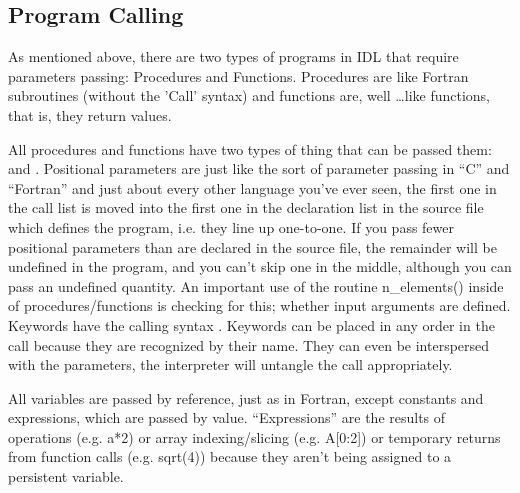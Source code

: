   \ei


\subsection{Program Calling}\label{sec:qs-calling-programs}
  
   As mentioned above, there are two types of programs in IDL that
  require parameters passing: Procedures and Functions. Procedures are
  like Fortran subroutines (without the 'Call' syntax) and functions
  are, well \ldots like functions, that is, they return values.

   All procedures and functions have two types of thing that can be
  passed them:  and
  . Positional parameters are just like the sort of
  parameter passing in ``C'' and ``Fortran'' and just about every
  other language you've ever seen, the first one in the call list is
  moved into the first one in the declaration list in the source file
  which defines the program, i.e. they line up one-to-one. If you pass
  fewer positional parameters than are declared in the source file,
  the remainder will be undefined in the program, and you can't skip one
  in the middle, although you can pass an undefined quantity. An important use of
  the routine n\_elements() inside of
  procedures/functions is checking for this; whether input arguments
  are defined.  Keywords have the calling syntax . Keywords can be placed in any order in the call because they
  are recognized by their name. They can even be interspersed with the
  parameters, the interpreter will untangle the call appropriately.

  All variables are passed by reference, just as in Fortran, except
  constants and expressions, which are passed by value.
  ``Expressions'' are the results of operations (e.g. a*2) or array
  indexing/slicing (e.g. A[0:2]) or temporary returns from function
  calls (e.g. sqrt(4)) because they aren't being assigned to a
  persistent variable.

